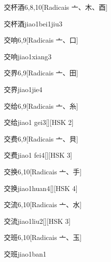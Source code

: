 \begin{entry}{交杯酒}{6,8,10}[Radicais ⼇、⽊、⾣]
  \begin{phonetics}{交杯酒}{jiao1bei1jiu3}
  \end{phonetics}
\end{entry}

\begin{entry}{交响}{6,9}[Radicais ⼇、⼝]
  \begin{phonetics}{交响}{jiao1xiang3}
  \end{phonetics}
\end{entry}

\begin{entry}{交界}{6,9}[Radicais ⼇、⽥]
  \begin{phonetics}{交界}{jiao1jie4}
  \end{phonetics}
\end{entry}

\begin{entry}{交给}{6,9}[Radicais ⼇、⽷]
  \begin{phonetics}{交给}{jiao1 gei3}[][HSK 2]
  \end{phonetics}
\end{entry}

\begin{entry}{交费}{6,9}[Radicais ⼇、⾙]
  \begin{phonetics}{交费}{jiao1 fei4}[][HSK 3]
  \end{phonetics}
\end{entry}

\begin{entry}{交换}{6,10}[Radicais ⼇、⼿]
  \begin{phonetics}{交换}{jiao1huan4}[][HSK 4]
  \end{phonetics}
\end{entry}

\begin{entry}{交流}{6,10}[Radicais ⼇、⽔]
  \begin{phonetics}{交流}{jiao1liu2}[][HSK 3]
  \end{phonetics}
\end{entry}

\begin{entry}{交班}{6,10}[Radicais ⼇、⽟]
  \begin{phonetics}{交班}{jiao1ban1}
  \end{phonetics}
\end{entry}

